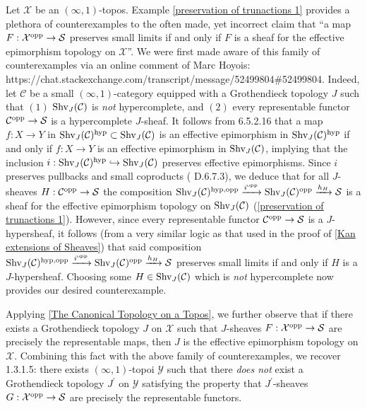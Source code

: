 \documentclass[10pt]{article}
\newcommand{\mS}{\mathcal S}
\newcommand{\C}{\mathcal C}
\newcommand{\cX}{\mathcal{X}}
\newcommand{\cY}{\mathcal{Y}}
\theoremstyle{witharg}
\theoremstyle{witharg}
\theoremstyle{witharg2}
\begin{document}
\begin{remark}{}\label{counterexample of sheaf for subcanonical topology not preserving limits}

    Let $\cX$ be an $(\infty,1)$-topos. Example \ref{preservation of trunactions 1} provides a plethora of counterexamples to the often made, yet incorrect claim that ``a map $F:\cX^{\textnormal{opp}}\rightarrow \mS$ preserves small limits if and only if $F$ is a sheaf for the effective epimorphism topology on $\cX$''. We were first made aware of this family of counterexamples via an online comment of Marc Hoyois: https://chat.stackexchange.com/transcript/message/52499804\#52499804. Indeed, let $\C$ be a small $(\infty,1)$-category equipped with a Grothendieck topology $J$ such that $(1)$ $\textnormal{Shv}_J(\C)$ is \emph{not} hypercomplete, and $(2)$ every representable functor $\C^{\textnormal{opp}}\rightarrow \mS$ is a hypercomplete $J$-sheaf. It follows from  6.5.2.16 that a map $f:X\rightarrow Y$ in $\textnormal{Shv}_J(\C)^{\textnormal{hyp}}\subset \textnormal{Shv}_J(\C)$ is an effective epimorphism in $\textnormal{Shv}_J(\C)^{\textnormal{hyp}}$ if and only if $f:X\rightarrow Y$ is an effective epimorphism in $\textnormal{Shv}_J(\C)$, implying that the inclusion $i:\textnormal{Shv}_J(\C)^{\textnormal{hyp}}\hookrightarrow \textnormal{Shv}_J(\C)$ preserves effective epimorphisms. Since $i$ preserves pullbacks and small coproducts ( D.6.7.3), we deduce that for all $J$-sheaves $H:\C^{\textnormal{opp}}\rightarrow \mS$ the composition $\textnormal{Shv}_J(\C)^{\textnormal{hyp},\textnormal{opp}}\xrightarrow{i^{\textnormal{opp}}} \textnormal{Shv}_J(\C)^{\textnormal{opp}}\xrightarrow{h_H}\mS$ is a sheaf for the effective epimorphism topology on $\textnormal{Shv}_J(\C)$ (\ref{preservation of trunactions 1}). However, since every representable functor $\C^{\textnormal{opp}}\rightarrow \mS$ is a $J$-hypersheaf, it follows (from a very similar logic as that used in the proof of \ref{Kan extensions of Sheaves}) that said composition $\textnormal{Shv}_J(\C)^{\textnormal{hyp},\textnormal{opp}}\xrightarrow{i^{\textnormal{opp}}}\textnormal{Shv}_J(\C)^{\textnormal{opp}}\xrightarrow{h_H}\mS$ preserves small limits if and only if $H$ is a $J$-hypersheaf. Choosing some $H\in \textnormal{Shv}_J(\C)$ which is \emph{not} hypercomplete now provides our desired counterexample.

    Applying \ref{The Canonical Topology on a Topos}, we further observe that if there exists a Grothendieck topology $J$ on $\cX$ such that $J$-sheaves $F:\cX^{\textnormal{opp}}\rightarrow \mS$ are precisely the representable maps, then $J$ is the effective epimorphism topology on $\cX$. Combining this fact with the above family of counterexamples, we recover  1.3.1.5: there exists $(\infty,1)$-topoi $\cY$ such that there \emph{does not} exist a Grothendieck topology $J^\prime$ on $\cY$ satisfying the property that $J^\prime$-sheaves $G:\cX^{\textnormal{opp}}\rightarrow \mS$ are precisely the representable functors. 
    
\end{remark}
\end{document}
